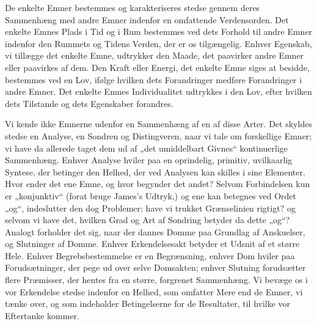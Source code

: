 \documentclass[12pt,a4paper]{book}
\newcommand{\opage}[1]{\marginnote{\footnotesize\textit{[#1]}}}
\begin{document}
De enkelte Emner bestemmes og karakteriseres stedse gennem deres Sammenhæng med andre
Emner indenfor en omfattende Verdensorden. Det enkelte Emnes Plads i Tid og i Rum
bestemmes ved dets Forhold til andre Emner indenfor den Rummets og Tidens Verden, der er
os tilgængelig. Enhver Egenskab, vi tillægge det enkelte Emne, udtrykker den Maade, det
paavirker andre Emner eller paavirkes af dem. Den Kraft eller Energi, det enkelte Emne
siges at besidde, bestemmes ved en Lov, ifølge hvilken dets Forandringer medføre
Forandringer i andre Emner. Det enkelte Emnes Individualitet udtrykkes i den Lov, efter
hvilken dets Tilstande og dets Egenskaber forandres.

\opage{325} Vi kende ikke Emnerne udenfor en Sammenhæng af en af disse Arter. Det skyldes stedse en
Analyse, en Sondren og Distingveren, naar vi tale om forskellige Emner; vi have da
allerede taget dem ud af „det umiddelbart Givnes“ kontinuerlige Sammenhæng. Enhver
Analyse hviler paa en oprindelig, primitiv, uvilkaarlig Syntese, der betinger den Helhed,
der ved Analysen kan skilles i sine Elementer. Hvor ender det ene Emne, og hvor begynder
det andet? Selvom Forbindelsen kun er „konjunktiv“ (forat bruge James's Udtryk,) og ene kan betegnes ved Ordet „og“, indeslutter den dog Problemer: have vi trukket Grænselinien
rigtigt? og selvom vi have det, hvilken Grad og Art af Sondring betyder da dette „og“?
Analogt forholder det sig, naar der dannes Domme paa Grundlag af Anskuelser, og
Slutninger af Domme. Enhver Erkendelsesakt betyder et Udsnit af et større Hele. Enhver
Begrebsbestemmelse er en Begrænsning, enhver Dom hviler paa Forudsætninger, der pege ud
over selve Domsakten; enhver Slutning forudsætter flere Præmisser, der hentes fra en
større, forgrenet Sammenhæng. Vi bevæge os i vor Erkendelse stedse indenfor en Helhed,
som omfatter Mere end de Emner, vi tænke over, og som indeholder Betingelserne for de
Resultater, til hvilke vor Eftertanke kommer.
\end{document}
